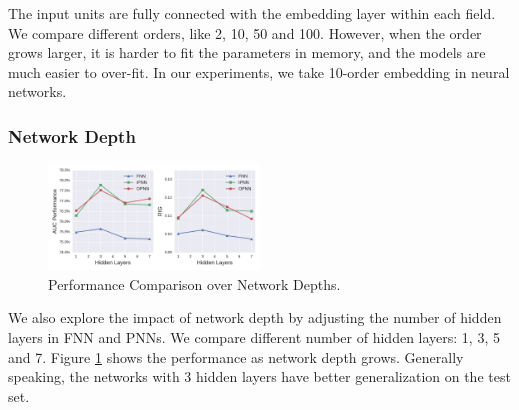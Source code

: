 \documentclass[conference]{IEEEtran}
\newcommand{\kan}[1]{{\bf \color{green} [[Kan says ``#1'']]}}
\begin{document}
The input units are fully connected with the embedding layer within each field.
We compare different orders, like 2, 10, 50 and 100. However, when the order grows larger, it is harder to fit the parameters in memory, and the models are much easier to over-fit.
In our experiments, we take 10-order embedding in neural networks.


\subsubsection{Network Depth}%

\begin{figure}[t]
	\centering
	\includegraphics[width=0.5\textwidth]{figure/nn-depth-short-2.pdf}
	\caption{Performance Comparison over Network Depths.}\label{fig:depth}
\end{figure}

We also explore the impact of network depth by adjusting the number of hidden layers in FNN and PNNs.
We compare different number of hidden layers: 1, 3, 5 and 7. Figure \ref{fig:depth} shows the performance as network depth grows. Generally speaking, the networks with 3 hidden layers have better generalization on the test set.
\end{document}
